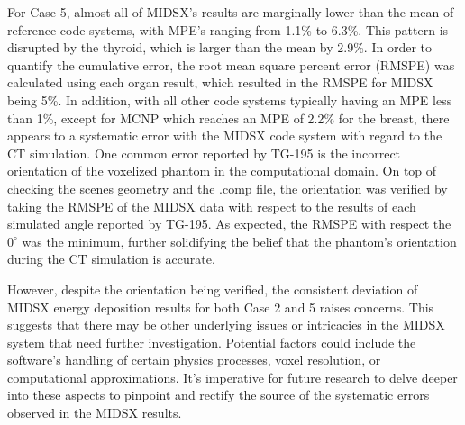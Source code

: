 \par For Case 5, almost all of MIDSX's results are marginally lower than the mean of reference code systems, with MPE's ranging from 1.1\% to 6.3\%. This pattern is disrupted by the thyroid, which is larger than the mean by 2.9\%. In order to quantify the cumulative error, the root mean square percent error (RMSPE) was calculated using each organ result, which resulted in the RMSPE for MIDSX being 5\%. In addition, with all other code systems typically having an MPE less than 1\%, except for MCNP which reaches an MPE of 2.2\% for the breast, there appears to a systematic error with the MIDSX code system with regard to the CT simulation. One common error reported by TG-195 is the incorrect orientation of the voxelized phantom in the computational domain. On top of checking the scenes geometry and the .comp file, the orientation was verified by taking the RMSPE of the MIDSX data with respect to the results of each simulated angle reported by TG-195. As expected, the RMSPE with respect the $0^\circ$ was the minimum, further solidifying the belief that the phantom's orientation during the CT simulation is accurate.

\par However, despite the orientation being verified, the consistent deviation of MIDSX energy deposition results for both Case 2 and 5 raises concerns. This suggests that there may be other underlying issues or intricacies in the MIDSX system that need further investigation. Potential factors could include the software's handling of certain physics processes, voxel resolution, or computational approximations. It's imperative for future research to delve deeper into these aspects to pinpoint and rectify the source of the systematic errors observed in the MIDSX results.

